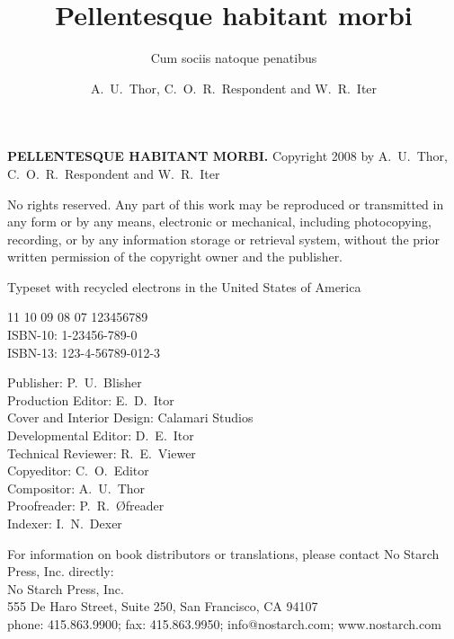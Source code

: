 \documentclass[cfonts,nofontsdir]{nostarch}
\begin{document}
\frontmatter

\author{A.~U.~Thor, C.~O.~R.~Respondent and W.~R.~Iter}

\title{Pellentesque habitant morbi}

\subtitle{Cum sociis natoque penatibus}


\makehalftitle

\maketitle


\begin{copyrightpage}
  \textbf{\sffamily\MakeUppercase{Pellentesque habitant morbi.}}
  Copyright \textcopyright{} 2008 by A.~U.~Thor, C.~O.~R.~Respondent
  and W.~R.~Iter

  No rights reserved. Any part of this work may be reproduced or
  transmitted in any form or by any means, electronic or mechanical,
  including photocopying, recording, or by any information storage or
  retrieval system, without the prior written permission of the
  copyright owner and the publisher.

   Typeset
  with recycled electrons in the United States of America

11 10 09 08 07 \hspace{0.5in}  123456789\\
ISBN-10: 1-23456-789-0\\
ISBN-13: 123-4-56789-012-3

Publisher: P.~U.~Blisher\\
Production Editor: E.~D.~Itor\\
Cover and Interior Design: Calamari Studios\\
Developmental Editor: D.~E.~Itor\\
Technical Reviewer: R.~E.~Viewer\\
Copyeditor: C.~O.~Editor\\
Compositor: A.~U.~Thor\\
Proofreader: P.~R.~\O freader\\
Indexer: I.~N.~Dexer

For information on book distributors or translations, please contact
No Starch Press, Inc. directly: \\
No Starch Press, Inc.\\
555 De Haro Street, Suite 250, San Francisco, CA 94107\\
phone: 415.863.9900; fax: 415.863.9950; info@nostarch.com; www.nostarch.com\\


\end{copyrightpage}
\end{document}
